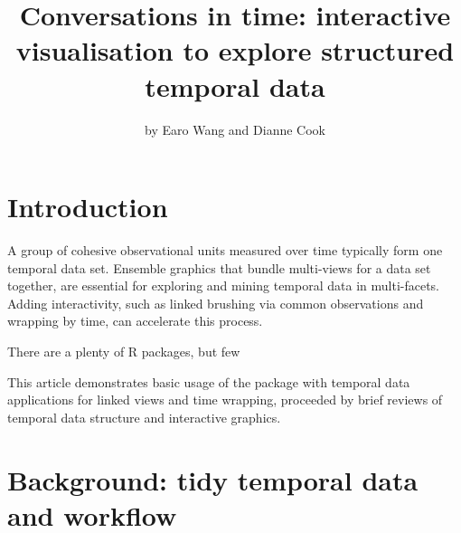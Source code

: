 \title{Conversations in time: interactive visualisation to explore structured
temporal data}
\author{by Earo Wang and Dianne Cook}

\maketitle


\hypertarget{introduction}{%
\section{Introduction}\label{introduction}}

A group of cohesive observational units measured over time typically
form one temporal data set. Ensemble graphics
\citep{unwin_ensemble_2018} that bundle multi-views for a data set
together, are essential for exploring and mining temporal data in
multi-facets. Adding interactivity, such as linked brushing via common
observations and wrapping by time, can accelerate this process.

There are a plenty of R packages, but few

This article demonstrates basic usage of the 
package with temporal data applications for linked views and time
wrapping, proceeded by brief reviews of temporal data structure and
interactive graphics.

\hypertarget{background-tidy-temporal-data-and-workflow}{%
\section{Background: tidy temporal data and
workflow}\label{background-tidy-temporal-data-and-workflow}}

